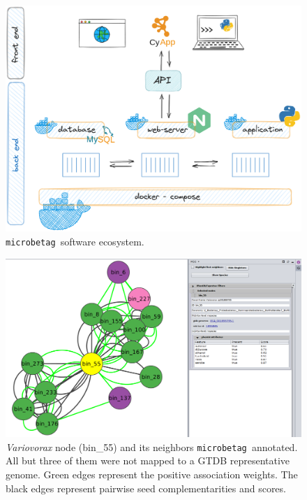\documentclass[sn-mathphys,Numbered]{sn-jnl}  %
\theoremstyle{thmstyleone}%
\theoremstyle{thmstyletwo}%
\theoremstyle{thmstylethree}%
\newcommand{\microbetag}{\texttt{microbetag }}
\begin{document}
\begin{appendices}
        \begin{figure}[H]
            \includegraphics*[width=0.9\columnwidth]{figs/architecture.png}
            \caption{
                \microbetag software ecosystem.
            }
        \label{fig:s1}
        \end{figure}
    
        \begin{figure}[H]
            \includegraphics*[width=0.9\columnwidth]{figs/node55Neigh.png}
            \caption{
                \textit{Variovorax} node (bin\_55) and its neighbors \microbetag annotated. 
                All but three of them were not mapped to a GTDB representative genome. 
                Green edges represent the positive association weights. 
                The black edges represent pairwise seed complementarities and scores.
            }
            \label{fig:s2}
        \end{figure}
        


\end{appendices}
\end{document}
